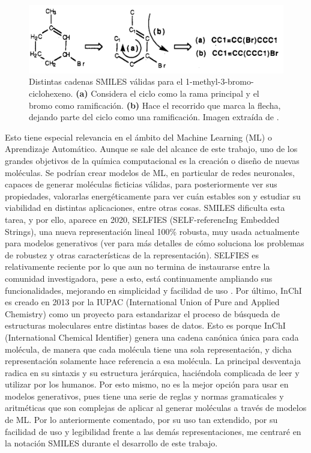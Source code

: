 \begin{figure}[h!]
\centering
    \includegraphics[scale=0.4]{imagenes/intro/sinonimos.png}
    \caption{Distintas cadenas SMILES válidas para el 1-methyl-3-bromo-ciclohexeno. \textbf{(a)} Considera el ciclo como la rama principal y el bromo como ramificación. \textbf{(b)} Hace el recorrido que marca la flecha, dejando parte del ciclo como una ramificación. Imagen extraída de \cite{weininger_smiles_1988}.}
    \label{fig:sinonimos_smiles}
\end{figure}

Esto tiene especial relevancia en el ámbito del Machine Learning (ML) o Aprendizaje Automático. Aunque se sale del alcance de este trabajo, uno de los grandes objetivos de la química computacional es la creación o diseño de nuevas moléculas. Se podrían crear modelos de ML, en particular de redes neuronales, capaces de generar moléculas ficticias válidas, para posteriormente ver sus propiedades, valorarlas energéticamente para ver cuán estables son y estudiar su viabilidad en distintas aplicaciones, entre otras cosas. SMILES dificulta esta tarea, y por ello, aparece en 2020, SELFIES (SELF-referencIng Embedded Strings), una nueva representación lineal 100\% robusta, muy usada actualmente para modelos generativos (ver \cite{SELFIES, krenn_self_referencing_2020} para más detalles de cómo soluciona los problemas de robustez y otras características de la representación). SELFIES es relativamente reciente por lo que aun no termina de instaurarse entre la comunidad investigadora, pese a esto, está continuamente ampliando sus funcionalidades, mejorando en simplicidad y facilidad de uso \cite{selfies_recent_2023}. Por último, InChI es creado en 2013 por la IUPAC (International Union of Pure and Applied Chemistry) como un proyecto para estandarizar el proceso de búsqueda de estructuras moleculares entre distintas bases de datos. Esto es porque InChI (International Chemical Identifier) genera una cadena canónica única para cada molécula, de manera que cada molécula tiene una sola representación, y dicha representación solamente hace referencia a esa molécula. La principal desventaja radica en su sintaxis y su estructura jerárquica, haciéndola complicada de leer y utilizar por los humanos. Por esto mismo, no es la mejor opción para usar en modelos generativos, pues tiene una serie de reglas y normas gramaticales y aritméticas que son complejas de aplicar al generar moléculas a través de modelos de ML\cite{heller_inchi_2015}. Por lo anteriormente comentado, por su uso tan extendido, por su facilidad de uso y legibilidad frente a las demás representaciones, me centraré en la notación SMILES durante el desarrollo de este trabajo. 

